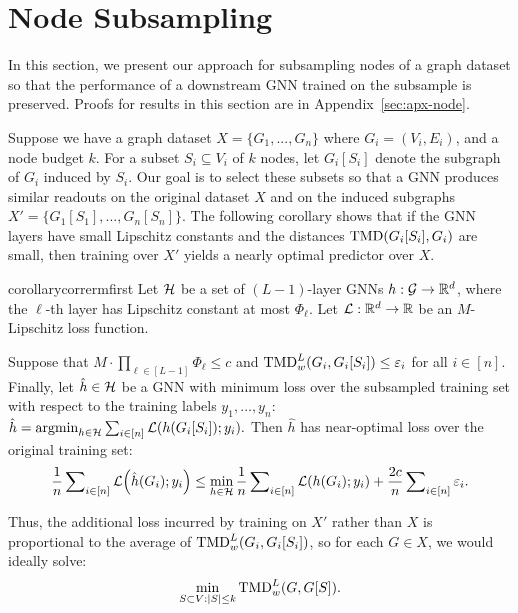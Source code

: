 \section{Node Subsampling}\label{sec:node_drop}

In this section, we present our approach for subsampling nodes of a graph dataset so that the performance of a downstream GNN trained on the subsample is preserved. Proofs for results in this section are in Appendix~\ref{sec:apx-node}.

Suppose we have a graph dataset $X= \{G_1, ..., G_n\}$ where $G_i = (V_i, E_i)$, and a node budget $k$. For a subset $S_i \subseteq V_i$ of $k$ nodes, let $G_i[S_i]$ denote the subgraph of $G_i$ induced by $S_i.$ Our goal is to {select these subsets so} that a GNN produces similar readouts on the original dataset $X$ and on the induced subgraphs $X' = \{G_1[S_1], ..., G_n[S_n]\}$. The following corollary shows that if the GNN layers have small Lipschitz constants and the distances $\textnormal{TMD}(G_i[S_i], G_i)$ are small, then training over $X'$ yields a nearly optimal predictor over $X$. 

\begin{restatable}{corollary}{corrermfirst}\label{corr:erm-first} Let $\mathcal H$ be a set of $(L-1)$-layer GNNs $h: \mathcal G \to \mathbb R^d$, where the $\ell$-th layer has Lipschitz constant at most $\Phi_\ell$. Let $\mathcal L: \mathbb R^d \to \mathbb R$ be an $M$-Lipschitz loss function. 

Suppose that $M \cdot \prod_{\ell \in [L-1]} \Phi_\ell \leq c$ and $\textnormal{TMD}_w^L(G_i, G_i[S_i]) \leq \varepsilon_i$ for all $i \in [n]$. Finally, let $\hat{h} \in \mathcal H$ be a GNN with minimum loss over the subsampled training set with respect to the training labels $y_1, \dots, y_n$: $\hat{h} = \operatorname*{argmin}\nolimits_{h \in \mathcal H}\sum\nolimits_{i \in [n]} \mathcal L(h(G_i[S_i]); y_i).$
Then $\hat{h}$ has near-optimal loss over the original training set:
\begin{align*}
    \frac{1}{n}\sum\nolimits_{i \in [n]} \mathcal L\Big({\hat{h}(G_i); y_i}\Big) \leq  \min_{h \in \mathcal H} \frac{1}{n}\sum\nolimits_{i \in [n]} \mathcal L(h(G_i); y_i) + \frac{2c}{n}\sum\nolimits_{i \in [n]} \varepsilon_i.
\end{align*}
\end{restatable}

Thus, the additional {loss incurred by} training on $X'$ rather than $X$ is proportional to the average of {$\textnormal{TMD}_{w}^L(G_i, G_i[S_i])$}, so for each $G \in X$, we would ideally solve:
\begin{equation}
    \min_{S \subset V: \left\lvert S\right\rvert \leq k} \textnormal{TMD}_w^L(G, G[S]).\label{eq:node-subsampling}
\end{equation}

